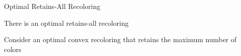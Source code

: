 \begin{frame}{Optimal Retains-All Recoloring}
\begin{lemma}
There is an optimal retains-all recoloring
\end{lemma}
\pause
Consider an optimal convex recoloring that retains the maximum number of colors

\end{frame}